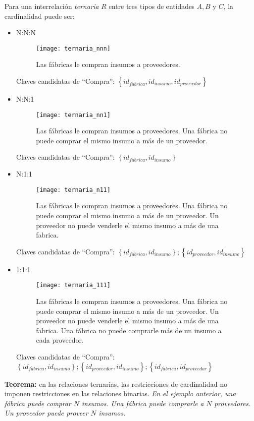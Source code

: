 \documentclass[a4paper, twoside]{article}
\begin{document}
Para una interrelación \emph{ternaria} $R$ entre tres tipos de entidades $A,B$ y $C$, la cardinalidad puede ser:	\begin{itemize}
	\item N:N:N
	\begin{figure}[H]
		\centering
		\texttt{[image: ternaria\_nnn]}
		\caption{Las fábricas le compran insumos a proveedores.}
	\end{figure}

	Claves candidatas de ``Compra'': $\left\{ id_{f\acute{a}brica},id_{insumo},id_{proveedor}\right\} $

	\item N:N:1
	\begin{figure}[H]
		\centering
		\texttt{[image: ternaria\_nn1]}
		\caption{Las fábricas le compran insumos a proveedores. Una fábrica no puede comprar el mismo insumo a más de un proveedor.}
	\end{figure}

	Claves candidatas de ``Compra'': $\left\{ id_{f\acute{a}brica},id_{insumo}\right\} $

	\item N:1:1
	\begin{figure}[H]
		\centering
		\texttt{[image: ternaria\_n11]}
		\caption{Las fábricas le compran insumos a proveedores. Una fábrica no puede comprar el mismo insumo a más de un proveedor. Un proveedor no puede venderle el mismo insumo a más de una fabrica.}
	\end{figure}

	Claves candidatas de ``Compra'': $\left\{ id_{f\acute{a}brica},id_{insumo}\right\} ;\left\{ id_{proveedor},id_{insumo}\right\} $

	\item 1:1:1
	\begin{figure}[H]
		\centering
		\texttt{[image: ternaria\_111]}
		\caption{Las fábricas le compran insumos a proveedores. Una fábrica no puede comprar el mismo insumo a más de un proveedor. Un proveedor no puede venderle el mismo insumo a más de una fabrica. Una fábrica no puede comprarle más de un insumo a cada proveedor.}
	\end{figure}

	Claves candidatas de ``Compra'': $\left\{ id_{f\acute{a}brica},id_{insumo}\right\} ;\left\{ id_{proveedor},id_{insumo}\right\} ;\left\{ id_{f\acute{a}brica},id_{proveedor}\right\} $
\end{itemize}

\textbf{Teorema:} en las relaciones ternarias, las restricciones de cardinalidad no imponen restricciones en las relaciones binarias. \emph{En el ejemplo anterior, una fábrica puede comprar $N$ insumos. Una fábrica puede comprarle a $N$ proveedores. Un proveedor puede proveer $N$ insumos.}
\end{document}
